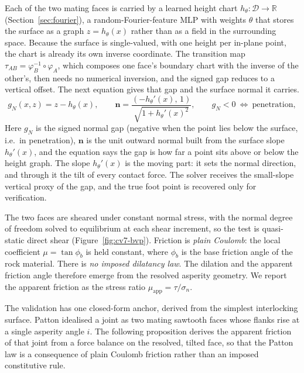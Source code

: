 \documentclass{svjour3}                 %
\newcommand{\R}{\mathbb{R}}
\newcommand{\nbf}{\bm{n}}
\newcommand{\gn}{g_{\scriptscriptstyle N}}
\newcommand{\tmap}{\tau_{AB}}
\newcommand{\map}[1]{\varphi_{#1}}
\newcommand{\muapp}{\mu_{\mathrm{app}}}
\begin{document}
Each of the two mating faces is carried by a learned height chart $h_\theta:\mathcal D\to\R$ (Section~\ref{sec:fourier}), a random-Fourier-feature MLP with weights $\theta$ that stores the surface as a graph $z=h_\theta(x)$ rather than as a field in the surrounding space. Because the surface is single-valued, with one height per in-plane point, the chart is already its own inverse coordinate. The transition map $\tmap=\map{B}^{-1}\circ\map{A}$, which composes one face's boundary chart with the inverse of the other's, then needs no numerical inversion, and the signed gap reduces to a vertical offset. The next equation gives that gap and the surface normal it carries.
%
\begin{equation}\label{eq:cv7-gap}
\gn(x,z)=z-h_\theta(x),\qquad
\nbf=\frac{(-h_\theta'(x),\,1)}{\sqrt{1+h_\theta'(x)^2}},\qquad \gn<0\ \Leftrightarrow\ \text{penetration},
\end{equation}
%
Here $\gn$ is the signed normal gap (negative when the point lies below the surface, i.e.\ in penetration), $\nbf$ is the unit outward normal built from the surface slope $h_\theta'(x)$, and the equation says the gap is how far a point sits above or below the height graph. The slope $h_\theta'(x)$ is the moving part: it sets the normal direction, and through it the tilt of every contact force. The solver receives the small-slope vertical proxy of the gap, and the true foot point is recovered only for verification.

The two faces are sheared under constant normal stress, with the normal degree of freedom solved to equilibrium at each shear increment, so the test is quasi-static direct shear (Figure~\ref{fig:cv7-bvp}). Friction is \emph{plain Coulomb}: the local coefficient $\mu=\tan\phi_b$ is held constant, where $\phi_b$ is the base friction angle of the rock material. There is \emph{no imposed dilatancy law}. The dilation and the apparent friction angle therefore emerge from the resolved asperity geometry. We report the apparent friction as the stress ratio $\muapp=\tau/\sigma_n$.

The validation has one closed-form anchor, derived from the simplest interlocking surface. Patton
\citep{patton1966multiple} idealised a joint as two mating sawtooth faces whose flanks rise at a single
asperity angle $i$. The following proposition derives the apparent friction of that joint from a force balance
on the resolved, tilted face, so that the Patton law is a consequence of plain Coulomb friction rather than an
imposed constitutive rule.
\end{document}
